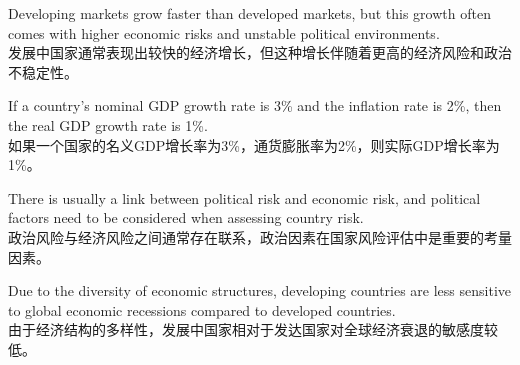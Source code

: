 \documentclass{article}
\begin{document}
        \begin{choices}
            \item Developing markets grow faster than developed markets, but this growth often comes with higher economic risks and unstable political environments.\\ 
            发展中国家通常表现出较快的经济增长，但这种增长伴随着更高的经济风险和政治不稳定性。
            \item If a country's nominal GDP growth rate is 3\% and the inflation rate is 2\%, then the real GDP growth rate is 1\%.\\ 
            如果一个国家的名义GDP增长率为3\%，通货膨胀率为2\%，则实际GDP增长率为1\%。
            \item There is usually a link between political risk and economic risk, and political factors need to be considered when assessing country risk.\\ 
            政治风险与经济风险之间通常存在联系，政治因素在国家风险评估中是重要的考量因素。
            \item Due to the diversity of economic structures, developing countries are less sensitive to global economic recessions compared to developed countries.\\ 
            由于经济结构的多样性，发展中国家相对于发达国家对全球经济衰退的敏感度较低。
        \end{choices}
        
\end{document}
